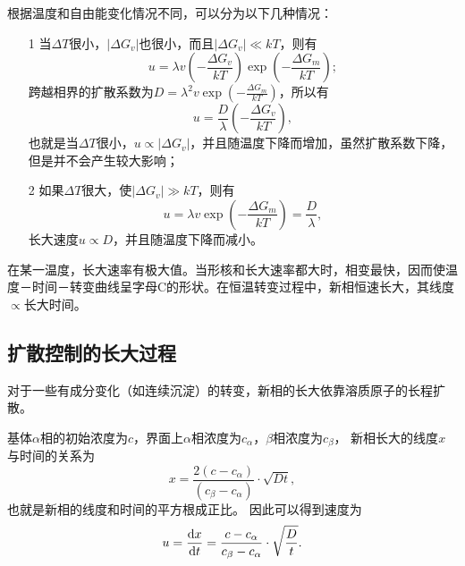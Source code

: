             根据温度和自由能变化情况不同，可以分为以下几种情况：
            \begin{itemize}
                \item[1] 当$\Delta T$很小，$|\Delta G_v|$也很小，而且$|\Delta G_v|\ll kT$，则有
                        \begin{equation}
                            u=\lambda v\left(-\frac{\Delta G_{v}}{k T}\right) \exp \left(-\frac{\Delta G_{m}}{k T}\right);
                        \end{equation} 
                        跨越相界的扩散系数为$D=\lambda^2v \exp \left( -\frac{\Delta G_m}{kT} \right)$，所以有
                        \begin{equation}
                            u=\frac{D}{\lambda}\left(-\frac{\Delta G_{v}}{k T}\right),
                        \end{equation}
                        也就是当$\Delta T$很小，$u\propto|\Delta G_v|$，并且随温度下降而增加，虽然扩散系数下降，但是并不会产生较大影响；
                \item[2] 如果$\Delta T$很大，使$|\Delta G_v|\gg kT$，则有
                        \begin{equation}
                            u=\lambda v \exp \left(-\frac{\Delta G_{m}}{k T}\right)=\frac{D}{\lambda},
                        \end{equation} 
                        长大速度$u\propto D$，并且随温度下降而减小。
            \end{itemize}
            在某一温度，长大速率有极大值。当形核和长大速率都大时，相变最快，因而使温度－时间－转变曲线呈字母C的形状。在恒温转变过程中，新相恒速长大，其线度$\propto$长大时间。
        \subsection{扩散控制的长大过程}
            对于一些有成分变化（如连续沉淀）的转变，新相的长大依靠溶质原子的长程扩散。

            基体$\alpha$相的初始浓度为$c$，界面上$\alpha$相浓度为$c_{\alpha}$，$\beta$相浓度为$c_\beta$，
            新相长大的线度$x$与时间的关系为
            \begin{equation}
                x=\frac{2\left( c-c_{\alpha} \right)}{\left( c_{\beta}-c_{\alpha} \right)}\cdot\sqrt{Dt},
            \end{equation}
            也就是新相的线度和时间的平方根成正比。
            因此可以得到速度为
            \begin{equation}
                u=\frac{\mathop{}\!\mathrm{d} x}{\mathop{}\!\mathrm{d} t}=\frac{c-c_\alpha}{c_\beta-c_\alpha}\cdot\sqrt{\frac{D}{t}}.
            \end{equation}
